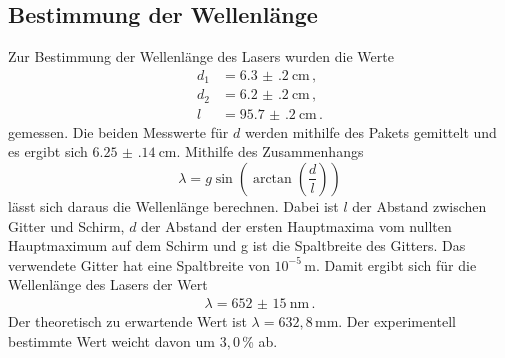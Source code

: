 \subsection{Bestimmung der Wellenlänge}
\label{subsec:wellenlaenge}
Zur Bestimmung der Wellenlänge des Lasers wurden die Werte
\begin{align*}
  d_1&=\SI{6.3(2)}{\centi\metre} \,,\\
  d_2&=\SI{6.2(2)}{\centi\metre}  \,,\\
  l&=\SI{95.7(2)}{\centi\metre} \,.
\end{align*}
gemessen.
Die beiden Messwerte für $d$ werden mithilfe des Pakets \cite{uncertainties}
gemittelt und es ergibt sich $\SI{6.25(14)}{\centi\metre}$.
Mithilfe des Zusammenhangs
\begin{equation*}
  \lambda= g \sin \left(\arctan\left(\frac{d}{l}\right)\right)
\end{equation*}
lässt sich daraus die Wellenlänge berechnen. Dabei ist $l$ der Abstand zwischen
Gitter und Schirm, $d$ der Abstand der ersten Hauptmaxima vom nullten Hauptmaximum
auf dem Schirm und g ist die Spaltbreite des Gitters. Das verwendete Gitter hat eine
Spaltbreite von $10^{-5}$\,m. Damit ergibt sich für die Wellenlänge des Lasers der Wert
\begin{align*}
  \lambda=\SI{652(15)}{\nano\metre}\,.
\end{align*}
Der theoretisch zu erwartende Wert ist $\lambda= 632,8$\,mm. Der experimentell bestimmte
Wert weicht davon um $3,0$\,\% ab.
